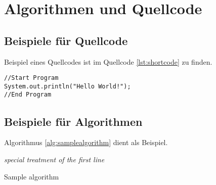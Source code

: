 \chapter{Algorithmen und Quellcode}

\section{Beispiele für Quellcode}

Beispiel eines Quellcodes ist im Quellcode \ref{lst:shortcode} zu finden.

\begin{lstlisting}[caption={Short code},label=lst:shortcode]
//Start Program
System.out.println("Hello World!");
//End Program
\end{lstlisting}


\section{Beispiele für Algorithmen}

Algorithmus \ref{alg:samplealgorithm} dient als Beispiel.

\begin{algorithm}[t]


\BlankLine

\emph{special treatment of the first line}\;
\caption{Sample algorithm}\label{alg:samplealgorithm}
\end{algorithm}